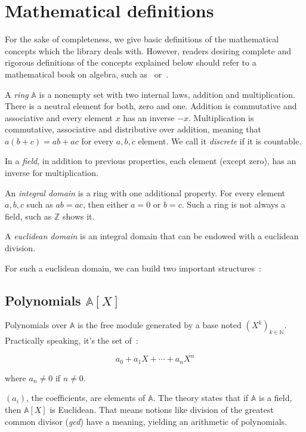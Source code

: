 \documentclass[twocolumn, switch]{article}
\begin{document}
\section{Mathematical definitions}

For the sake of completeness, we give basic definitions of the mathematical concepts which the library deals with. However, readers desiring complete and rigorous definitions of the concepts explained below should refer to a mathematical book on algebra, such as~\cite{lang2012algebra} or~\cite{bourbaki2013algebra}.

A \textit{ring} $\mathbb{A}$ is a nonempty set with two internal laws, addition and multiplication. There is a neutral element for both, zero and one.
Addition is commutative and associative and every element $x$ has an inverse $-x$. Multiplication is commutative, associative and distributive over addition, meaning that $a(b+c) = ab+ac$ for every $a, b, c$ element. We call it \textit{discrete} if it is countable.

In a \textit{field}, in addition to previous properties, each element (except zero), has an inverse for multiplication.

An \textit{integral domain} is a ring with one additional property. For every element $a, b, c$ such as $ab = ac$, then either $a = 0$ or $b = c$. Such a ring is not always a field, such as $\mathbb{Z}$ shows it.

A \textit{euclidean domain} is an integral domain that can be endowed with a euclidean division.

For such a euclidean domain, we can build two important structures~:

\subsection{Polynomials $\mathbb{A}[X]$}

Polynomials over $\mathbb{A}$ is the free module generated by a base noted $(X^k)_{k\in\mathbb{N}}$. Practically speaking, it's the set of~:

\[a_0 + a_1X + \cdots + a_nX^n\]

where $a_n \neq 0$ if $n \neq 0$.

$(a_i)$, the coefficients, are elements of $\mathbb{A}$. The theory states that if $\mathbb{A}$ is a field, then $\mathbb{A}[X]$ is Euclidean. That means notions like division of the greatest common divisor (\textit{gcd}) have a meaning, yielding an arithmetic of polynomials.
\end{document}
